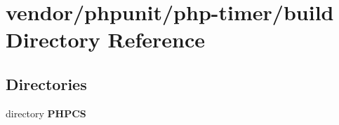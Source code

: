 \section{vendor/phpunit/php-\/timer/build Directory Reference}
\label{dir_14d46150deef8f39d1577cead28ea127}
\subsection*{Directories}
\begin{DoxyCompactItemize}
\item 
directory {\bf P\+H\+P\+C\+S}
\end{DoxyCompactItemize}
